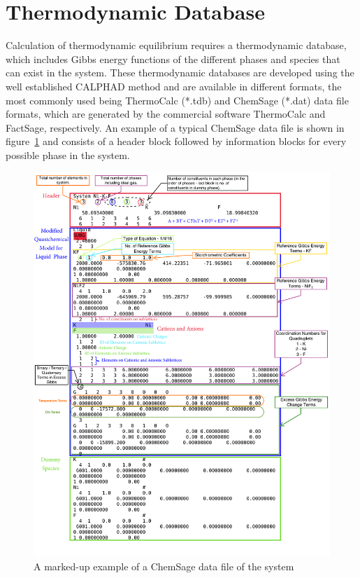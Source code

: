 \section{Thermodynamic Database}
	Calculation of thermodynamic equilibrium requires a thermodynamic database, which includes Gibbs energy functions of the different phases and species that can exist in the system. These thermodynamic databases are developed using the well established CALPHAD method \cite{liu_wang_2016} and are available in different formats, the most commonly used being ThermoCalc (*.tdb) and ChemSage (*.dat) data file formats, which are generated by the commercial software ThermoCalc and FactSage, respectively. An example of a typical ChemSage data file is shown in figure~\ref{fig:datfile} and consists of a header block followed by information blocks for every possible phase in the system.
	\begin{figure}[htbp]
	 	\centering
	   	\includegraphics[width=\textwidth]{figures/NiKF.pdf}
	   	\caption[A marked-up example of a ChemSage data file of the  system.]{A marked-up example of a ChemSage data file of the  system \cite{OcadizFlores18}}
	   	\label{fig:datfile}
	\end{figure}

